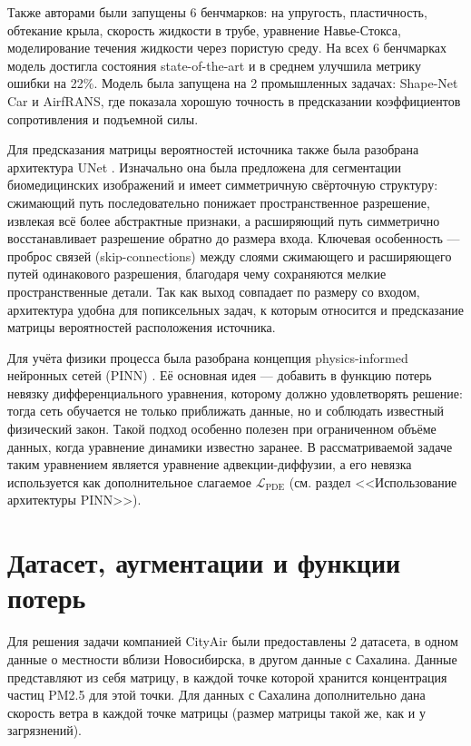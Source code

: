 \documentclass[12pt]{article}
\begin{document}
Также авторами были запущены 6 бенчмарков: на упругость, пластичность, обтекание крыла, скорость жидкости в трубе, уравнение Навье-Стокса, моделирование течения жидкости через пористую среду. На всех 6 бенчмарках модель достигла состояния state-of-the-art и в среднем улучшила метрику ошибки на 22\%.
Модель была запущена на 2 промышленных задачах: Shape-Net Car и AirfRANS, где показала хорошую точность в предсказании коэффициентов сопротивления и подъемной силы.

Для предсказания матрицы вероятностей источника также была разобрана архитектура UNet \cite{ronneberger2015unet}. Изначально она была предложена для сегментации биомедицинских изображений и имеет симметричную свёрточную структуру: сжимающий путь последовательно понижает пространственное разрешение, извлекая всё более абстрактные признаки, а расширяющий путь симметрично восстанавливает разрешение обратно до размера входа. Ключевая особенность --- проброс связей (skip-connections) между слоями сжимающего и расширяющего путей одинакового разрешения, благодаря чему сохраняются мелкие пространственные детали. Так как выход совпадает по размеру со входом, архитектура удобна для попиксельных задач, к которым относится и предсказание матрицы вероятностей расположения источника.

Для учёта физики процесса была разобрана концепция physics-informed нейронных сетей (PINN) \cite{RAISSI2019686}. Её основная идея --- добавить в функцию потерь невязку дифференциального уравнения, которому должно удовлетворять решение: тогда сеть обучается не только приближать данные, но и соблюдать известный физический закон. Такой подход особенно полезен при ограниченном объёме данных, когда уравнение динамики известно заранее. В рассматриваемой задаче таким уравнением является уравнение адвекции-диффузии, а его невязка используется как дополнительное слагаемое $\mathcal{L}_{\text{PDE}}$ (см. раздел <<Использование архитектуры PINN>>).

\newpage

\section{Датасет, аугментации и функции потерь}

Для решения задачи компанией CityAir были предоставлены 2 датасета, в одном данные о местности вблизи Новосибирска, в другом данные с Сахалина. Данные представляют из себя матрицу, в каждой точке которой хранится концентрация частиц PM2.5 для этой точки.
Для данных с Сахалина дополнительно дана скорость ветра в каждой точке матрицы (размер матрицы такой же, как и у загрязнений).
\end{document}
